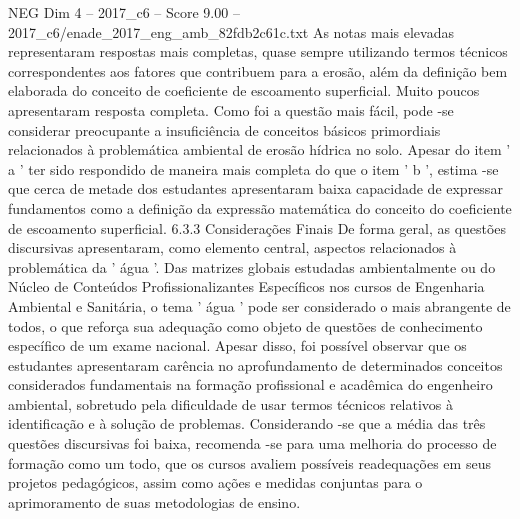 \begin{textsample}{NEG Dim 4 – 2017\_c6 – Score 9.00 – 2017\_c6/enade\_2017\_eng\_amb\_82fdb2c61c.txt}
As notas mais elevadas representaram respostas mais completas, quase sempre utilizando termos técnicos correspondentes aos fatores que contribuem para a erosão, além da definição bem elaborada do conceito de coeficiente de escoamento superficial.
Muito poucos apresentaram resposta completa.
Como foi a questão mais fácil, pode -se considerar preocupante a insuficiência de conceitos básicos primordiais relacionados à problemática ambiental de erosão hídrica no solo.
Apesar do item ' a ' ter sido respondido de maneira mais completa do que o item ' b ', estima -se que cerca de metade dos estudantes apresentaram baixa capacidade de expressar fundamentos como a definição da expressão matemática do conceito do coeficiente de escoamento superficial. 6.3.3 Considerações Finais De forma geral, as questões discursivas apresentaram, como elemento central, aspectos relacionados à problemática da ' água '.
Das matrizes globais estudadas ambientalmente ou do Núcleo de Conteúdos Profissionalizantes Específicos nos cursos de Engenharia Ambiental e Sanitária, o tema ' água ' pode ser considerado o mais abrangente de todos, o que reforça sua adequação como objeto de questões de conhecimento específico de um exame nacional.
Apesar disso, foi possível observar que os estudantes apresentaram carência no aprofundamento de determinados conceitos considerados fundamentais na formação profissional e acadêmica do engenheiro ambiental, sobretudo pela dificuldade de usar termos técnicos relativos à identificação e à solução de problemas.
Considerando -se que a média das três questões discursivas foi baixa, recomenda -se para uma melhoria do processo de formação como um todo, que os cursos avaliem possíveis readequações em seus projetos pedagógicos, assim como ações e medidas conjuntas para o aprimoramento de suas metodologias de ensino.

\end{textsample}
